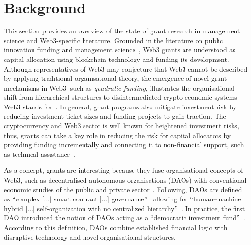 \documentclass[conference]{IEEEtran}
\begin{document}
\section{Background}\label{sec_2}

This section provides an overview of the state of grant research in management science and Web3-specific literature. Grounded in the literature on public innovation funding and management science~\cite{albors_impact_2011,bartle_review_2003}, Web3 grants are understood as capital allocation using blockchain technology and funding its development. Although representatives of Web3 may conjecture that Web3 cannot be described by applying traditional organisational theory, the emergence of novel grant mechanisms in Web3, such as \textit{quadratic funding}, illustrates the organisational shift from hierarchical structures to disintermediated crypto-economic systems Web3 stands for~\cite[p.~501]{shermin_disrupting_2017}. In general, grant programs also mitigate investment risk by reducing investment ticket sizes and funding projects to gain traction. The cryptocurrency and Web3 sector is well known for heightened investment risks, thus, grants can take a key role in reducing the risk for capital allocators by providing funding incrementally and connecting it to non-financial support, such as technical assistance~\cite[p.~6]{gilbert_sustainable_2019}.

As a concept, grants are interesting because they fuse organisational concepts of Web3, such as decentralised autonomous organisations (DAOs) with conventional economic studies of the public and private sector~\cite{ding_desci_2022,monteiro_decentralised_2023,wang_self-sovereign_2020}. Following, DAOs are defined as “complex [...] smart contract [...] governance”~\cite[p.~501]{shermin_disrupting_2017} allowing for “human–machine hybrid [...] self-organization with no centralized hierarchy”~\cite[p.~1564]{ding_desci_2022}. In practice, the first DAO introduced the notion of DAOs acting as a “democratic investment fund”~\cite[p.~4]{santos_dao_2018}. According to this definition, DAOs combine established financial logic with disruptive technology and novel organisational structures. 
\end{document}
